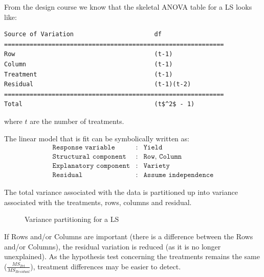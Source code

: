 \documentclass[a4paper, 10pt, fleqn, twosided]{memoir}
\begin{document}
From the design course we know that the skeletal ANOVA table for a LS looks like:

\begin{lstlisting}[mathescape=true]
Source of Variation                      df
============================================================
Row                                      (t-1)
Column                                   (t-1)
Treatment                                (t-1)
Residual                                 (t-1)(t-2)
============================================================
Total                                    (t$^2$ - 1)
\end{lstlisting}

where $t$ are the number of treatments.

The linear model that is fit can be symbolically written as:
\begin{eqnarray*}
	\texttt{Response variable}&:& \texttt{Yield} \\
	\texttt{Structural component}&:& \texttt{Row, Column}\\
	\texttt{Explanatory component}&:& \texttt{Variety}\\
	\texttt{Residual}&:& \texttt{Assume independence}
\end{eqnarray*}



The total variance associated with the data is partitioned up into variance associated with the treatments, rows,
columns and residual.


\begin{figure}[!hbtp]
\centering
{}
\caption{Variance partitioning for a LS}
\label{fig:lsbucket}
\end{figure}

If Rows and/or Columns are important (there is a difference between the Rows and/or Columns), the residual variation is
reduced (as it is no longer unexplained). As the hypothesis test concerning the treatments remains the same
($\frac{MS_{Trt}}{MS_{Residual}}$), treatment differences may be easier to detect.
\end{document}

